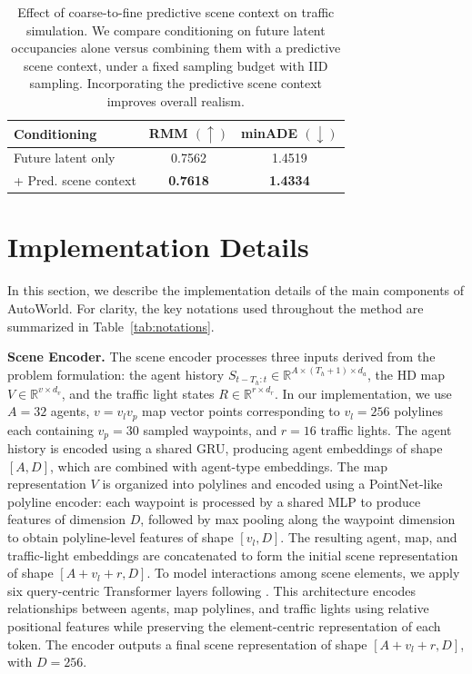 \documentclass[runningheads]{llncs}
\begin{document}
\begin{table}[h]
\centering
\setlength{\tabcolsep}{6pt}
\caption{Effect of coarse-to-fine predictive scene context on traffic simulation. We compare conditioning on future latent occupancies alone versus combining them with a predictive scene context, under a fixed sampling budget with IID sampling. Incorporating the predictive scene context improves overall realism.}
\begin{tabular}{lcc}
    \toprule
    \textbf{Conditioning} & \textbf{RMM} $(\uparrow)$ & \textbf{minADE} $(\downarrow)$ \\
    \midrule
    Future latent only & 0.7562 & 1.4519 \\
    + Pred. scene context & \textbf{0.7618} & \textbf{1.4334} \\
    \bottomrule
\end{tabular} \vspace{-4mm}
\label{tab:coarse_to_fine}
\end{table}


\section{Implementation Details} 
\label{app_implementation}
In this section, we describe the implementation details of the main components of AutoWorld. For clarity, the key notations used throughout the method are summarized in Table~\ref{tab:notations}.

\textbf{Scene Encoder.} The scene encoder processes three inputs derived from the problem formulation: the agent history $S_{t-T_h:t} \in \mathbb{R}^{A \times (T_h+1) \times d_a}$, the HD map $V \in \mathbb{R}^{v \times d_v}$, and the traffic light states $R \in \mathbb{R}^{r \times d_r}$. In our implementation, we use $A=32$ agents, $v = v_l v_p$ map vector points corresponding to $v_l=256$ polylines each containing $v_p=30$ sampled waypoints, and $r=16$ traffic lights. The agent history is encoded using a shared GRU, producing agent embeddings of shape $[A, D]$, which are combined with agent-type embeddings. The map representation $V$ is organized into polylines and encoded using a PointNet-like polyline encoder: each waypoint is processed by a shared MLP to produce features of dimension $D$, followed by max pooling along the waypoint dimension to obtain polyline-level features of shape $[v_l, D]$. The resulting agent, map, and traffic-light embeddings are concatenated to form the initial scene representation of shape $[A + v_l + r, D]$. To model interactions among scene elements, we apply six query-centric Transformer layers following \cite{shi2024mtr++}. This architecture encodes relationships between agents, map polylines, and traffic lights using relative positional features while preserving the element-centric representation of each token. The encoder outputs a final scene representation of shape $[A + v_l + r, D]$, with $D=256$.
\end{document}
